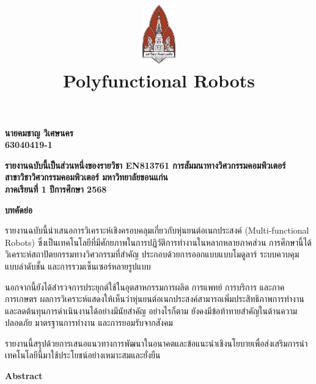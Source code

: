 \documentclass[a4paper]{article}
\date{}
\author{}
\title{
    \includegraphics[width=1in, height=1in, keepaspectratio]{logo.png}
    \\[2ex]
    {\fontsize{32pt}{36pt}\selectfont\textbf{Polyfunctional Robots}}
}
\begin{document}
\maketitle
\thispagestyle{empty}

\vfill
\begin{center}
    {\fontsize{22pt}{26pt}\selectfont\textbf{
        นายคมชาญ วิเศษนคร
        \\ 63040419-1
    }}
\end{center}
\vfill

\vfill
\begin{center}
    {\fontsize{16pt}{20pt}\selectfont\textbf{
        รายงานฉบับนี้เป็นส่วนหนึ่งของรายวิชา EN813761 การสัมมนาทางวิศวกรรมคอมพิวเตอร์
        \\ สาขาวิชาวิศวกรรมคอมพิวเตอร์ มหาวิทยาลัยขอนแก่น
        \\ ภาคเรียนที่ 1 ปีการศึกษา 2568
    }}
\end{center}

\newpage

\setcounter{page}{1}

\noindent
{\centering
    {\fontsize{18pt}{22pt}\selectfont\textbf{บทคัดย่อ}\par}
}

\begin{justify}
รายงานฉบับนี้นำเสนอการวิเคราะห์เชิงครอบคลุมเกี่ยวกับหุ่นยนต์อเนกประสงค์ (Multi-functional Robots) ซึ่งเป็นเทคโนโลยีที่มีศักยภาพในการปฏิวัติการทำงานในหลากหลายภาคส่วน การศึกษานี้ได้วิเคราะห์สถาปัตยกรรมทางวิศวกรรมที่สำคัญ ประกอบด้วยการออกแบบแบบโมดูลาร์ ระบบควบคุมแบบลำดับชั้น และการรวมเซ็นเซอร์หลายรูปแบบ 

นอกจากนี้ยังได้สำรวจการประยุกต์ใช้ในอุตสาหกรรมการผลิต การแพทย์ การบริการ และภาคการเกษตร ผลการวิเคราะห์แสดงให้เห็นว่าหุ่นยนต์อเนกประสงค์สามารถเพิ่มประสิทธิภาพการทำงานและลดต้นทุนการดำเนินงานได้อย่างมีนัยสำคัญ อย่างไรก็ตาม ยังคงมีข้อท้าทายสำคัญในด้านความปลอดภัย มาตรฐานการทำงาน และการยอมรับจากสังคม 

รายงานนี้สรุปด้วยการเสนอแนวทางการพัฒนาในอนาคตและข้อแนะนำเชิงนโยบายเพื่อส่งเสริมการนำเทคโนโลยีนี้มาใช้ประโยชน์อย่างเหมาะสมและยั่งยืน
\end{justify}

\vspace{1em}

\noindent
{\centering
    {\fontsize{18pt}{22pt}\selectfont\textbf{Abstract}\par}
}
\end{document}
